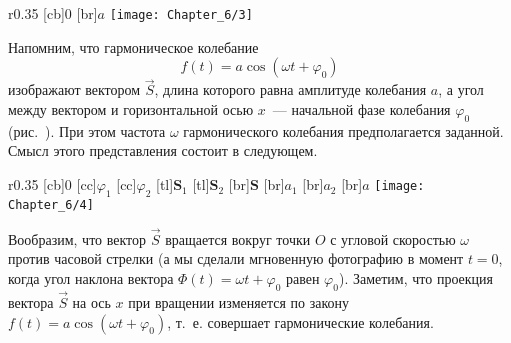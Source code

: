 




\begin{wrapfigure}[]{r}{0.35\textwidth}
    [cb]{0}
    [br]{$a$}
    \texttt{[image: Chapter\_6/3]}
    \caption{}
\end{wrapfigure}

Напомним, что гармоническое колебание
\begin{equation*}
    f(t)=a\cos(\omega t+\varphi_0)
\end{equation*}
изображают вектором $\vec{S}$, длина которого равна амплитуде колебания $a$, а
угол между вектором и горизонтальной осью
$x$~--- начальной фазе колебания $\varphi_0$ (рис.~). При
этом частота $\omega$ гармонического колебания предполагается
заданной. Смысл этого представления состоит в следующем.

\begin{wrapfigure}[]{r}{0.35\textwidth}
    [cb]{0}
    [cc]{$\varphi_1$}
    [cc]{$\varphi_2$}
    [tl]{$\mathbf{S}_1$}
    [tl]{$\mathbf{S}_2$}
    [br]{$\mathbf{S}$}
    [br]{$a_1$}
    [br]{$a_2$}
    [br]{$a$}
    \texttt{[image: Chapter\_6/4]}
    \caption{}
\end{wrapfigure}

Вообразим, что вектор $\vec{S}$ вращается вокруг точки $O$ с угловой скоростью
$\omega$ против часовой стрелки (а мы
сделали мгновенную фотографию в момент $t=0$, когда угол наклона вектора
$\Phi(t)=\omega t + \varphi_0$ равен $\varphi_0$).
Заметим, что проекция вектора $\vec{S}$ на ось $x$ при вращении изменяется по
закону $f(t)=a\cos(\omega t+\varphi_0)$, т.~е.
совершает гармонические колебания.

